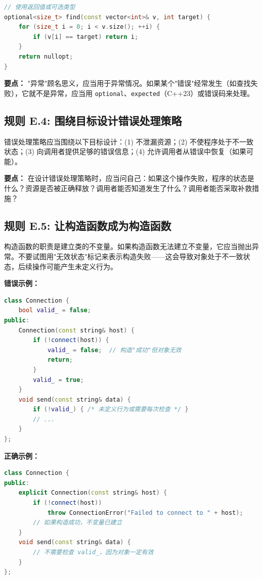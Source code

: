 \begin{lstlisting}[language=C++]
// 使用返回值或可选类型
optional<size_t> find(const vector<int>& v, int target) {
    for (size_t i = 0; i < v.size(); ++i) {
        if (v[i] == target) return i;
    }
    return nullopt;
}
\end{lstlisting}

\textbf{要点：} "异常"顾名思义，应当用于异常情况。如果某个"错误"经常发生（如查找失败），它就不是异常，应当用 \texttt{optional}、\texttt{expected}（C++23）或错误码来处理。

\subsection*{\textbf{规则 E.4:} 围绕目标设计错误处理策略}

错误处理策略应当围绕以下目标设计：(1) 不泄漏资源；(2) 不使程序处于不一致状态；(3) 向调用者提供足够的错误信息；(4) 允许调用者从错误中恢复（如果可能）。

\textbf{要点：} 在设计错误处理策略时，应当问自己：如果这个操作失败，程序的状态是什么？资源是否被正确释放？调用者能否知道发生了什么？调用者能否采取补救措施？

\subsection*{\textbf{规则 E.5:} 让构造函数成为构造函数}

构造函数的职责是建立类的不变量。如果构造函数无法建立不变量，它应当抛出异常。不要试图用"无效状态"标记来表示构造失败——这会导致对象处于不一致状态，后续操作可能产生未定义行为。

\textbf{错误示例：}

\begin{lstlisting}[language=C++]
class Connection {
    bool valid_ = false;
public:
    Connection(const string& host) {
        if (!connect(host)) {
            valid_ = false;  // 构造"成功"但对象无效
            return;
        }
        valid_ = true;
    }
    void send(const string& data) {
        if (!valid_) { /* 未定义行为或需要每次检查 */ }
        // ...
    }
};
\end{lstlisting}

\textbf{正确示例：}

\begin{lstlisting}[language=C++]
class Connection {
public:
    explicit Connection(const string& host) {
        if (!connect(host))
            throw ConnectionError("Failed to connect to " + host);
        // 如果构造成功，不变量已建立
    }
    void send(const string& data) {
        // 不需要检查 valid_，因为对象一定有效
    }
};
\end{lstlisting}

